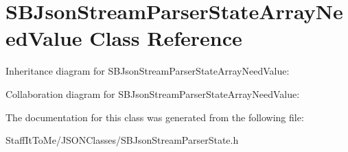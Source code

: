 \hypertarget{interface_s_b_json_stream_parser_state_array_need_value}{
\section{\-S\-B\-Json\-Stream\-Parser\-State\-Array\-Need\-Value \-Class \-Reference}
\label{interface_s_b_json_stream_parser_state_array_need_value}
}


\-Inheritance diagram for \-S\-B\-Json\-Stream\-Parser\-State\-Array\-Need\-Value\-:


\-Collaboration diagram for \-S\-B\-Json\-Stream\-Parser\-State\-Array\-Need\-Value\-:


\-The documentation for this class was generated from the following file\-:\begin{DoxyCompactItemize}
\item 
\-Staff\-It\-To\-Me/\-J\-S\-O\-N\-Classes/\-S\-B\-Json\-Stream\-Parser\-State.\-h\end{DoxyCompactItemize}
